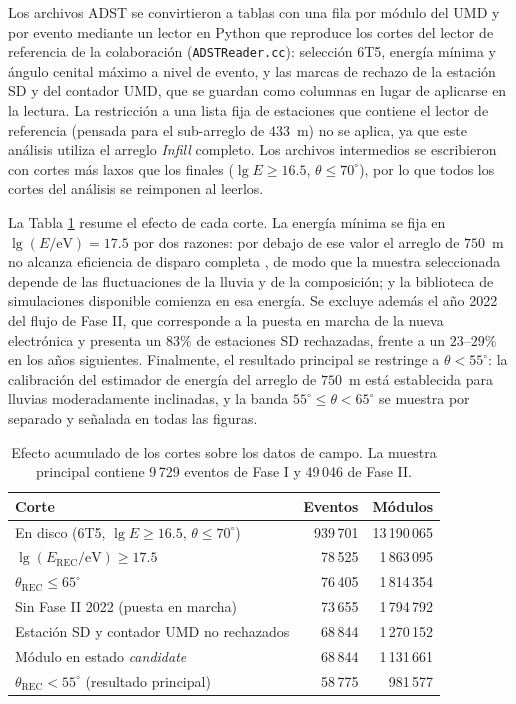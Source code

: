 Los archivos ADST se convirtieron a tablas con una fila por módulo del UMD y por evento mediante un lector en Python que reproduce los cortes del lector de referencia de la colaboración (\texttt{ADSTReader.cc}): selección 6T5, energía mínima y ángulo cenital máximo a nivel de evento, y las marcas de rechazo de la estación SD y del contador UMD, que se guardan como columnas en lugar de aplicarse en la lectura. La restricción a una lista fija de estaciones que contiene el lector de referencia (pensada para el sub-arreglo de $433$~m) no se aplica, ya que este análisis utiliza el arreglo \textit{Infill} completo. Los archivos intermedios se escribieron con cortes más laxos que los finales ($\lg E \geq 16.5$, $\theta \leq 70^\circ$), por lo que todos los cortes del análisis se reimponen al leerlos.

La Tabla \ref{tab:cut_flow} resume el efecto de cada corte. La energía mínima se fija en $\lg(E/\mathrm{eV}) = 17.5$ por dos razones: por debajo de ese valor el arreglo de $750$~m no alcanza eficiencia de disparo completa \cite{auger2021infill}, de modo que la muestra seleccionada depende de las fluctuaciones de la lluvia y de la composición; y la biblioteca de simulaciones disponible comienza en esa energía. %
Se excluye además el año 2022 del flujo de Fase II, que corresponde a la puesta en marcha de la nueva electrónica y presenta un $83\%$ de estaciones SD rechazadas, frente a un $23$--$29\%$ en los años siguientes. Finalmente, el resultado principal se restringe a $\theta < 55^\circ$: la calibración del estimador de energía del arreglo de $750$~m está establecida para lluvias moderadamente inclinadas, y la banda $55^\circ \leq \theta < 65^\circ$ se muestra por separado y señalada en todas las figuras. %

\begin{table}[H]
	\centering
	\begin{tabular}{lrr}
		\toprule
		Corte & Eventos & Módulos \\
		\midrule
		En disco (6T5, $\lg E \geq 16.5$, $\theta \leq 70^\circ$) & 939\,701 & 13\,190\,065 \\
		$\lg(E_\mathrm{REC}/\mathrm{eV}) \geq 17.5$ & 78\,525 & 1\,863\,095 \\
		$\theta_\mathrm{REC} \leq 65^\circ$ & 76\,405 & 1\,814\,354 \\
		Sin Fase II 2022 (puesta en marcha) & 73\,655 & 1\,794\,792 \\
		Estación SD y contador UMD no rechazados & 68\,844 & 1\,270\,152 \\
		Módulo en estado \textit{candidate} & 68\,844 & 1\,131\,661 \\
		$\theta_\mathrm{REC} < 55^\circ$ (resultado principal) & 58\,775 & 981\,577 \\
		\bottomrule
	\end{tabular}
	\caption{Efecto acumulado de los cortes sobre los datos de campo. La muestra principal contiene 9\,729 eventos de Fase I y 49\,046 de Fase II.}
	\label{tab:cut_flow}
\end{table}

